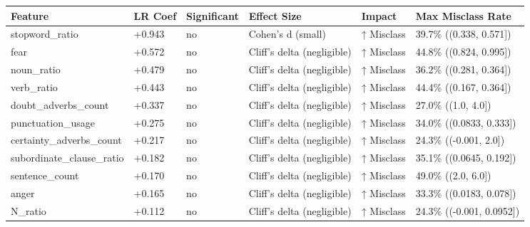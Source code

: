\begin{tabular}{llllll}
\toprule
Feature & LR Coef & Significant & Effect Size & Impact & Max Misclass Rate \\
\midrule
stopword\_ratio & +0.943 & no & Cohen's d (small) & ↑ Misclass & 39.7\% ((0.338, 0.571]) \\
fear & +0.572 & no & Cliff's delta (negligible) & ↑ Misclass & 44.8\% ((0.824, 0.995]) \\
noun\_ratio & +0.479 & no & Cliff's delta (negligible) & ↑ Misclass & 36.2\% ((0.281, 0.364]) \\
verb\_ratio & +0.443 & no & Cliff's delta (negligible) & ↑ Misclass & 44.4\% ((0.167, 0.364]) \\
doubt\_adverbs\_count & +0.337 & no & Cliff's delta (negligible) & ↑ Misclass & 27.0\% ((1.0, 4.0]) \\
punctuation\_usage & +0.275 & no & Cliff's delta (negligible) & ↑ Misclass & 34.0\% ((0.0833, 0.333]) \\
certainty\_adverbs\_count & +0.217 & no & Cliff's delta (negligible) & ↑ Misclass & 24.3\% ((-0.001, 2.0]) \\
subordinate\_clause\_ratio & +0.182 & no & Cliff's delta (negligible) & ↑ Misclass & 35.1\% ((0.0645, 0.192]) \\
sentence\_count & +0.170 & no & Cliff's delta (negligible) & ↑ Misclass & 49.0\% ((2.0, 6.0]) \\
anger & +0.165 & no & Cliff's delta (negligible) & ↑ Misclass & 33.3\% ((0.0183, 0.078]) \\
N\_ratio & +0.112 & no & Cliff's delta (negligible) & ↑ Misclass & 24.3\% ((-0.001, 0.0952]) \\
\bottomrule
\end{tabular}
